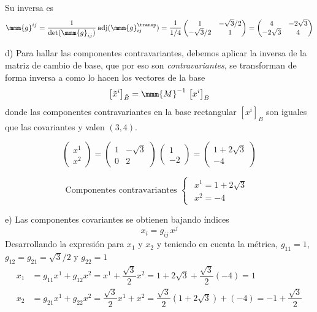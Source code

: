 Su inversa es
\[
  \mmm{g}^{ij}
  = \dfrac{1}{\det(\mmm{g}_{ij})}\, \text{adj}(\mmm{g}_{ij}^\transp)
  = \dfrac{1}{1/4}
  \begin{pmatrix}
    1 & -\sqrt{3}/2\\
    -\sqrt{3}/2 & 1
  \end{pmatrix}
  = \begin{pmatrix}
    4 & -2\sqrt{3}\\
    -2\sqrt{3} & 4
  \end{pmatrix}
\]

\noindent
d) Para hallar las componentes contravariantes, debemos aplicar la inversa de la matriz
de cambio de base, que por eso son \emph{contravariantes}, se transforman de forma
inversa a como lo hacen los vectores de la base
\[
  \left[\tilde{x}^i\right]_{\tilde{B}} = \mmm{M}^{-1}\, \left[x^i\right]_{B}
\]
donde las componentes contravariantes en la base rectangular $[x^i]_{B}$ son iguales
que las covariantes y valen $(3, 4)$.

\[
  \begin{pmatrix}
    x^1\\
    x^2
  \end{pmatrix}
  = \begin{pmatrix}
    1 & -\sqrt{3}\\
    0 & 2
  \end{pmatrix}
  \,
  \begin{pmatrix}
    1\\
    -2
  \end{pmatrix}
  = \begin{pmatrix}
    1+2\sqrt{3}\\
    -4
  \end{pmatrix}
\]

\[
  \text{Componentes contravariantes }
  \begin{cases}
    \begin{array}{l}
      x^1 = 1+2\sqrt{3}\\
      x^2 = -4
    \end{array}
  \end{cases}
\]


\noindent
e) Las componentes covariantes se obtienen bajando índices
\[
  x_i = g_{ij}\,x^j
\]
Desarrollando la expresión para $x_1$ y $x_2$ y teniendo en cuenta la métrica,
$g_{11} = 1$, $g_{12}=g_{21}=\sqrt{3}/2$ y $g_{22}=1$
\begin{align*}
  x_1
  &= g_{11}x^1 + g_{12}x^2 = x^1 + \dfrac{\sqrt{3}}{2}x^2
    = 1+2\sqrt{3} + \dfrac{\sqrt{3}}{2} (-4)
    = 1\\
  x_2
  &= g_{21}x^1 + g_{22} x^2 = \dfrac{\sqrt{3}}{2}x^1 + x^2
    = \dfrac{\sqrt{3}}{2}\left(1+2\sqrt{3}\right) + (-4)
    = -1 + \dfrac{\sqrt{3}}{2}
\end{align*}

